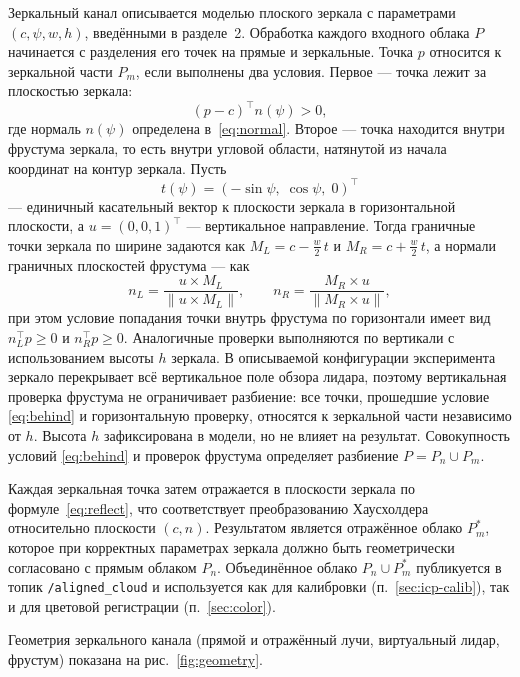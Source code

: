 \documentclass{misisarticle}
\begin{document}
Зеркальный канал описывается моделью плоского зеркала
с параметрами $(c, \psi, w, h)$, введёнными в разделе~2. Обработка
каждого входного облака $P$ начинается с разделения его точек на
прямые и зеркальные. Точка $p$ относится к зеркальной части $P_m$,
если выполнены два условия. Первое --- точка лежит за плоскостью
зеркала:
\begin{equation}
  (p - c)^{\top} n(\psi) > 0,
  \label{eq:behind}
\end{equation}
где нормаль $n(\psi)$ определена в~\eqref{eq:normal}. Второе --- точка
находится внутри фрустума зеркала, то есть внутри угловой области,
натянутой из начала координат на контур зеркала. Пусть
\begin{equation}
  t(\psi) = (-\sin\psi,\; \cos\psi,\; 0)^{\top}
\end{equation}
--- единичный касательный вектор к плоскости зеркала в горизонтальной
плоскости, а $u = (0,0,1)^{\top}$ --- вертикальное направление. Тогда
граничные точки зеркала по ширине задаются как
$M_L = c - \frac{w}{2}\,t$ и $M_R = c + \frac{w}{2}\,t$, а нормали
граничных плоскостей фрустума --- как
\begin{equation}
  n_L = \frac{u \times M_L}{\|u \times M_L\|}, \qquad
  n_R = \frac{M_R \times u}{\|M_R \times u\|},
\end{equation}
при этом условие попадания точки внутрь фрустума по горизонтали имеет
вид $n_L^{\top} p \ge 0$ и $n_R^{\top} p \ge 0$. Аналогичные проверки
выполняются по вертикали с использованием высоты $h$ зеркала.
В описываемой конфигурации эксперимента зеркало перекрывает всё
вертикальное поле обзора лидара, поэтому вертикальная проверка фрустума
не ограничивает разбиение: все точки, прошедшие условие \eqref{eq:behind}
и горизонтальную проверку, относятся к зеркальной части независимо от $h$.
Высота $h$ зафиксирована в модели, но не влияет на результат.
Совокупность условий \eqref{eq:behind} и проверок фрустума определяет
разбиение $P = P_n \cup P_m$.

Каждая зеркальная точка затем отражается в плоскости зеркала по
формуле~\eqref{eq:reflect}, что соответствует преобразованию
Хаусхолдера относительно плоскости $(c, n)$. Результатом является
отражённое облако $P_m^{*}$, которое при корректных параметрах зеркала
должно быть геометрически согласовано с прямым облаком $P_n$.
Объединённое облако $P_n \cup P_m^{*}$ публикуется в топик
\texttt{/aligned\_cloud} и используется как для калибровки
(п.~\ref{sec:icp-calib}), так и для цветовой регистрации
(п.~\ref{sec:color}).

Геометрия зеркального канала (прямой и отражённый лучи, виртуальный
лидар, фрустум) показана на рис.~\ref{fig:geometry}.
\end{document}
